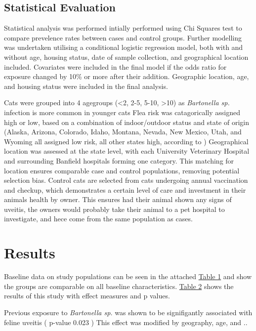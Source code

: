 \documentclass[11pt,twocolumn]{article}
\begin{document}
	\newpage
	\subsection{Statistical Evaluation}

		Statistical analysis was performed intially performed using Chi Squares test to compare prevelence rates between cases and control groups. 
		Further modelling was undertaken utilising a conditional logistic regression model, both with and without age, housing status, date of sample collection, and geographical location included. 
		Covariates were included in the final model if the odds ratio for exposure changed by 10\% or more after their addition.
		Geographic location, age, and housing status were included in the final analysis.


		Cats were grouped into 4 agegroups (\textless 2, 2-5, 5-10, \textgreater 10) as \emph{Bartonella sp.} infection is more common in younger cats
		Flea risk was catagorically assigned high or low, based on a combination of indoor/outdoor status and state of origin (Alaska, Arizona, Colorado, Idaho, Montana, Nevada, New Mexico, Utah, and Wyoming all assigned low risk, all other states high, according to \cite{Jameson1995a})
		Geographical location was assessed at the state level, with each University Veterinary Hospital and surrounding Banfield hospitals forming one category.
		This matching for location ensures comparable case and control populations, removing potential selection bias. 
		Control cats are selected from cats undergoing annual vaccination and checkup, which demonstrates a certain level of care and investment in their animals health by owner. This ensures had their animal shown any signs of uveitis, the owners would probably take their animal to a pet hospital to investigate, and hece come from the same population as cases.


		\newpage
\section{Results}


		Baseline data on study populations can be seen in the attached \hyperref[tab:1]{Table 1} and show the groups are comparable on all baseline characteristics.
		\hyperref[tab:2]{Table 2} shows the results of this study with effect measures and p values.


		Previous exposure to \emph{Bartonella sp.} was shown to be signifigantly associated with feline uveitis ( p-value 0.023 )
		This effect was modified by geography, age, and ..
\end{document}

